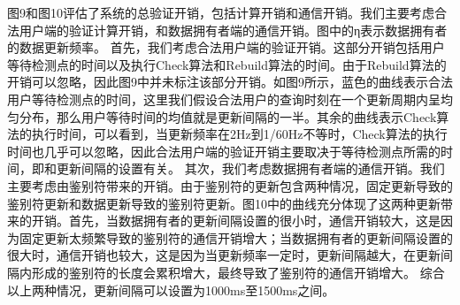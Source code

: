 图9和图10评估了系统的总验证开销，包括计算开销和通信开销。我们主要考虑合法用户端的验证计算开销，和数据拥有者端的通信开销。图中的η表示数据拥有者的数据更新频率。
首先，我们考虑合法用户端的验证开销。这部分开销包括用户等待检测点的时间以及执行Check算法和Rebuild算法的时间。由于Rebuild算法的开销可以忽略，因此图9中并未标注该部分开销。如图9所示，蓝色的曲线表示合法用户等待检测点的时间，这里我们假设合法用户的查询时刻在一个更新周期内呈均匀分布，那么用户等待时间的均值就是更新间隔的一半。其余的曲线表示Check算法的执行时间，可以看到，当更新频率在2Hz到1/60Hz不等时，Check算法的执行时间也几乎可以忽略，因此合法用户端的验证开销主要取决于等待检测点所需的时间，即和更新间隔的设置有关。
其次，我们考虑数据拥有者端的通信开销。我们主要考虑由鉴别符带来的开销。由于鉴别符的更新包含两种情况，固定更新导致的鉴别符更新和数据更新导致的鉴别符更新。图10中的曲线充分体现了这两种更新带来的开销。首先，当数据拥有者的更新间隔设置的很小时，通信开销较大，这是因为固定更新太频繁导致的鉴别符的通信开销增大；当数据拥有者的更新间隔设置的很大时，通信开销也较大，这是因为当更新频率一定时，更新间隔越大，在更新间隔内形成的鉴别符的长度会累积增大，最终导致了鉴别符的通信开销增大。
综合以上两种情况，更新间隔可以设置为1000ms至1500ms之间。
